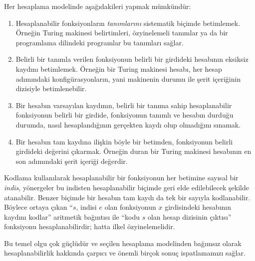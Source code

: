 \documentclass[../../../include/open-logic-section]{subfiles}
\begin{document}

Her hesaplama modelinde aşağıdakileri yapmak mümkündür:
\begin{enumerate}
\item Hesaplanabilir fonksiyonların \emph{tanımlarını} sistematik biçimde
  betimlemek. Örneğin Turing makinesi belirtimleri, özyinelemeli tanımlar ya
  da bir programlama dilindeki programlar bu tanımları sağlar.
\item Belirli bir tanımla verilen fonksiyonun belirli bir girdideki hesabının
  eksiksiz kaydını betimlemek. Örneğin bir Turing makinesi hesabı, her hesap
  adımındaki konfigürasyonların, yani makinenin durumu ile şerit içeriğinin
  dizisiyle betimlenebilir.
\item Bir hesabın varsayılan kaydının, belirli bir tanıma sahip hesaplanabilir
  fonksiyonun belirli bir girdide, fonksiyonun tanımlı ve hesabın durduğu
  durumda, nasıl hesaplandığının gerçekten kaydı olup olmadığını sınamak.
\item Bir hesabın tam kaydına ilişkin böyle bir betimden, fonksiyonun belirli
  girdideki değerini çıkarmak. Örneğin duran bir Turing makinesi hesabının
  en son adımındaki şerit içeriği değerdir.
\end{enumerate}

Kodlama kullanılarak hesaplanabilir bir fonksiyonun her betimine sayısal bir
\emph{indis}, yönergeler bu indisten hesaplanabilir biçimde geri elde
edilebilecek şekilde atanabilir. Benzer biçimde bir hesabın tam kaydı da tek
bir sayıyla kodlanabilir. Böylece ortaya çıkan ``$s$, indisi $e$ olan
fonksiyonun $x$ girdisindeki hesabının kaydını kodlar'' aritmetik bağıntısı
ile ``kodu $s$ olan hesap dizisinin çıktısı'' fonksiyonu hesaplanabilirdir;
hatta ilkel özyinelemelidir.

Bu temel olgu çok güçlüdür ve seçilen hesaplama modelinden bağımsız olarak
hesaplanabilirlik hakkında çarpıcı ve önemli birçok sonuç ispatlamamızı
sağlar.
\end{document}
